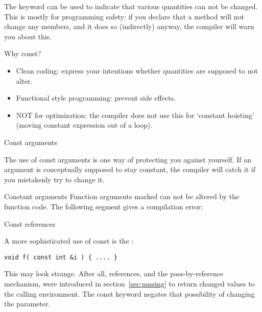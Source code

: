 
The keyword  can be used to indicate that various quantities
can not be changed. This is mostly for programming safety: if you
declare that a method will not change any members, and it does so
(indirectly) anyway, the compiler will warn you about this.

\begin{slide}{Why const?}
  \label{sl:why-const}
  \begin{itemize}
  \item Clean coding: express your intentions whether quantities are
    supposed to not alter.
  \item Functional style programming: prevent side effects.
  \item NOT for optimization: the compiler does not use this for `constant
    hoisting' (moving constant expression out of a loop).
  \end{itemize}
\end{slide}

 {Const arguments}
\label{sec:constparam}

The use of const arguments is one way of protecting you against yourself.
If an argument is conceptually supposed to stay constant, the compiler
will catch it if you mistakenly try to change it.

\begin{block}{Constant arguments}
  \label{sl:const-arg}
  Function arguments marked  can not be altered by
  the function code. The following segment gives a compilation error:
\end{block}

 {Const references}
\label{sec:const-ref}

A more sophisticated use of const is the
:
\begin{lstlisting}
void f( const int &i ) { .... }
\end{lstlisting}
This may look strange. After all, references, and the
pass-by-reference mechanism, were introduced in
section~\ref{sec:passing} to return changed values to the calling
environment. The const keyword negates that possibility of changing
the parameter.

